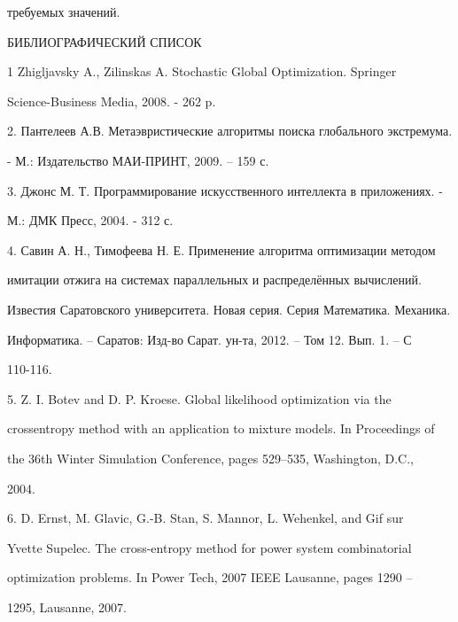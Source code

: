 \documentclass [12pt]{article}
\begin{document}
{требуемых значений.











БИБЛИОГРАФИЧЕСКИЙ СПИСОК











1 Zhigljavsky A., Zilinskas A. Stochastic Global Optimization. Springer 

Science-Business Media, 2008. - 262 p. 



2. Пантелеев А.В. Метаэвристические алгоритмы поиска глобального экстремума. 

- М.: Издательство МАИ-ПРИНТ, 2009. -- 159 с.



3. Джонс М. Т. Программирование искусственного интеллекта в приложениях. - 

М.: ДМК Пресс, 2004. - 312 с. 



4. Савин А. Н., Тимофеева Н. Е. Применение алгоритма оптимизации методом 

имитации отжига на системах параллельных и распределённых вычислений. 

Известия Саратовского университета. Новая серия. Серия Математика. Механика. 

Информатика. -- Саратов: Изд-во Сарат. ун-та, 2012. -- Том 12. Вып. 1. -- С 

110-116. 



5. Z. I. Botev and D. P. Kroese. Global likelihood optimization via the 

crossentropy method with an application to mixture models. In Proceedings of 

the 36th Winter Simulation Conference, pages 529--535, Washington, D.C., 

2004.



6. D. Ernst, M. Glavic, G.-B. Stan, S. Mannor, L. Wehenkel, and Gif sur 

Yvette Supelec. The cross-entropy method for power system combinatorial 

optimization problems. In Power Tech, 2007 IEEE Lausanne, pages 1290 -- 

1295, Lausanne, 2007. 



}
\end{document}
